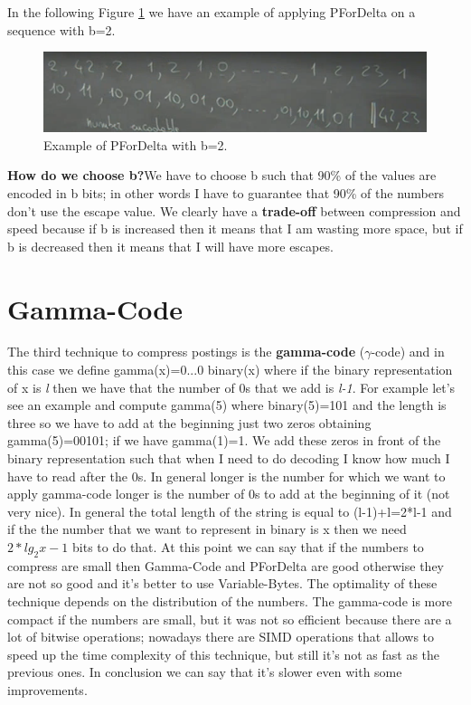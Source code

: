 In the following Figure \ref{fig:pfordeltab2} we have an example of applying PForDelta on a sequence with b=2.\newline
\begin{figure}
    \centering
    \includegraphics[width=0.75\linewidth]{images/pfordelta.PNG}
    \caption{Example of PForDelta with b=2.}
    \label{fig:pfordeltab2}
\end{figure}
\textbf{How do we choose b?}We have to choose b such that 90\% of the values are encoded in b bits; in other words I have to guarantee that 90\% of the numbers don't use the escape value.\newline
We clearly have a \textbf{trade-off} between compression and speed because if b is increased then it means that I am wasting more space, but if b is decreased then it means that I will have more escapes.\newline
\section{Gamma-Code}
The third technique to compress postings is the \textbf{gamma-code} ($\gamma$-code) and in this case we define gamma(x)=0...0 binary(x) where if the binary representation of x is \textit{l} then we have that the number of 0s that we add is \textit{l-1}.\newline
For example let's see an example and compute gamma(5) where binary(5)=101 and the length is three so we have to add at the beginning just two zeros obtaining gamma(5)=00101; if we have gamma(1)=1.\newline
We add these zeros in front of the binary representation such that when I need to do decoding I know how much I have to read after the 0s.\newline
In general longer is the number for which we want to apply gamma-code longer is the number of 0s to add at the beginning of it (not very nice).\newline
In general the total length of the string is equal to (l-1)+l=2*l-1 and if the the number that we want to represent in binary is x then we need $2*lg_2x-1$ bits to do that.\newline
At this point we can say that if the numbers to compress are small then Gamma-Code and PForDelta are good otherwise they are not so good and it's better to use Variable-Bytes. The optimality of these technique depends on the distribution of the numbers.\newline
The gamma-code is more compact if the numbers are small, but it was not so efficient because there are a lot of bitwise operations; nowadays there are SIMD operations that allows to speed up the time complexity of this technique, but still it's not as fast as the previous ones. In conclusion we can say that it's slower even with some improvements.\newline
